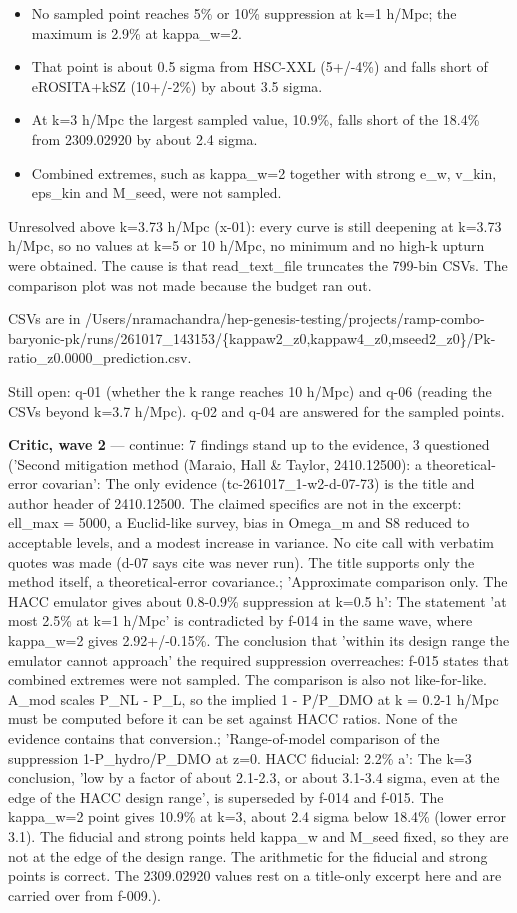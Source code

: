 \documentclass[11pt,a4paper]{article}
\begin{document}
\begin{itemize}
  \item No sampled point reaches 5\% or 10\% suppression at k=1 h/Mpc; the maximum is 2.9\% at kappa\_w=2.
  \item That point is about 0.5 sigma from HSC-XXL (5+/-4\%) and falls short of eROSITA+kSZ (10+/-2\%) by about 3.5 sigma.
  \item At k=3 h/Mpc the largest sampled value, 10.9\%, falls short of the 18.4\% from 2309.02920 by about 2.4 sigma.
  \item Combined extremes, such as kappa\_w=2 together with strong e\_w, v\_kin, eps\_kin and M\_seed, were not sampled.
\end{itemize}
Unresolved above k=3.73 h/Mpc (x-01): every curve is still deepening at k=3.73 h/Mpc, so no values at k=5 or 10 h/Mpc, no minimum and no high-k upturn were obtained. The cause is that read\_text\_file truncates the 799-bin CSVs. The comparison plot was not made because the budget ran out.

CSVs are in /Users/nramachandra/hep-genesis-testing/projects/ramp-combo-baryonic-pk/runs/261017\_143153/\{kappaw2\_z0,kappaw4\_z0,mseed2\_z0\}/Pk-ratio\_z0.0000\_prediction.csv.

Still open: q-01 (whether the k range reaches 10 h/Mpc) and q-06 (reading the CSVs beyond k=3.7 h/Mpc). q-02 and q-04 are answered for the sampled points.

\textbf{Critic, wave 2} --- continue: 7 findings stand up to the evidence, 3 questioned ('Second mitigation method (Maraio, Hall \& Taylor, 2410.12500): a theoretical-error covarian': The only evidence (tc-261017\_1-w2-d-07-73) is the title and author header of 2410.12500. The claimed specifics are not in the excerpt: ell\_max = 5000, a Euclid-like survey, bias in Omega\_m and S8 reduced to acceptable levels, and a modest increase in variance. No cite call with verbatim quotes was made (d-07 says cite was never run). The title supports only the method itself, a theoretical-error covariance.; 'Approximate comparison only. The HACC emulator gives about 0.8-0.9\% suppression at k=0.5 h': The statement 'at most 2.5\% at k=1 h/Mpc' is contradicted by f-014 in the same wave, where kappa\_w=2 gives 2.92+/-0.15\%. The conclusion that 'within its design range the emulator cannot approach' the required suppression overreaches: f-015 states that combined extremes were not sampled. The comparison is also not like-for-like. A\_mod scales P\_NL - P\_L, so the implied 1 - P/P\_DMO at k = 0.2-1 h/Mpc must be computed before it can be set against HACC ratios. None of the evidence contains that conversion.; 'Range-of-model comparison of the suppression 1-P\_hydro/P\_DMO at z=0. HACC fiducial: 2.2\% a': The k=3 conclusion, 'low by a factor of about 2.1-2.3, or about 3.1-3.4 sigma, even at the edge of the HACC design range', is superseded by f-014 and f-015. The kappa\_w=2 point gives 10.9\% at k=3, about 2.4 sigma below 18.4\% (lower error 3.1). The fiducial and strong points held kappa\_w and M\_seed fixed, so they are not at the edge of the design range. The arithmetic for the fiducial and strong points is correct. The 2309.02920 values rest on a title-only excerpt here and are carried over from f-009.).
\end{document}
